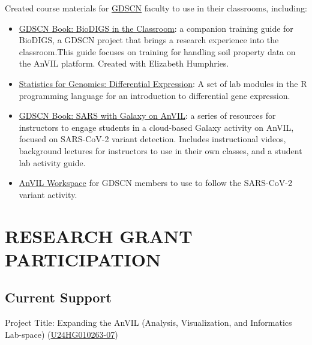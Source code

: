 \documentclass{cv}
\begin{document}
Created course materials for \href{https://www.gdscn.org/}{GDSCN} faculty to use in their classrooms, including: 

\begin{itemize}

\item \href{https://hutchdatascience.org/GDSCN_BioDIGS_Book/}{GDSCN Book: BioDIGS in the Classroom}: a companion training guide for BioDIGS, a GDSCN project that brings a research experience into the classroom.This guide focuses on training for handling soil property data on the AnVIL platform. Created with Elizabeth Humphries.

\item \href{https://jhudatascience.org/GDSCN_Book_Statistics_for_Genomics_Differential_Expression/}{Statistics for Genomics: Differential Expression}: A set of lab modules in the R programming language for an introduction to differential gene expression.

\item \href{https://jhudatascience.org/GDSCN_Book_SARS_Galaxy_on_AnVIL/}{GDSCN Book: SARS with Galaxy on AnVIL}: a series of resources for instructors to engage students in a cloud-based Galaxy activity on AnVIL, focused on SARS-CoV-2 variant detection. Includes instructional videos, background lectures for instructors to use in their own classes, and a student lab activity guide.

\item \href{https://anvil.terra.bio/#workspaces/gdscn-exercises/SARS-CoV-2-Genome}{AnVIL Workspace} for GDSCN members to use to follow the SARS-CoV-2 variant activity.

\end{itemize}


\section*{RESEARCH GRANT PARTICIPATION}

\subsection*{Current Support}

Project Title: Expanding the AnVIL (Analysis, Visualization, and Informatics Lab-space) (\href{https://reporter.nih.gov/search/n8pPuYzcskWEltb40MVBkA/project-details/10748042}{U24HG010263-07})
\end{document}
